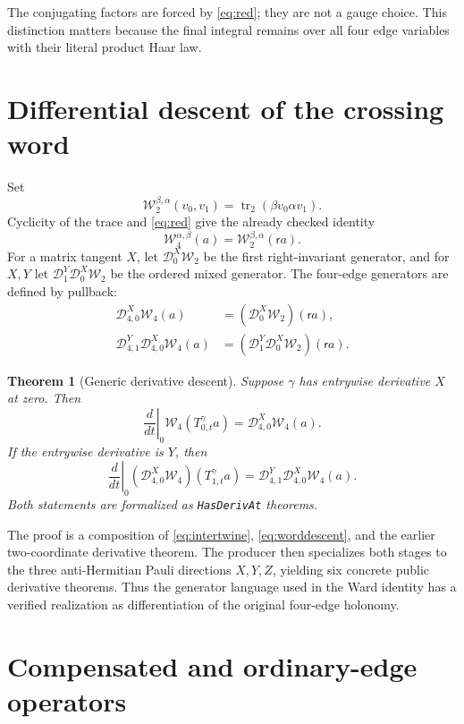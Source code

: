 \documentclass[11pt]{article}
\newtheorem{theorem}{Theorem}[section]
\theoremstyle{definition}
\newcommand{\trn}{\operatorname{tr}_2}
\newcommand{\red}{\mathsf r}
\newcommand{\W}{\mathcal W}
\newcommand{\D}{\mathcal D}
\begin{document}
The conjugating factors are forced by \eqref{eq:red}; they are not a gauge
choice.  This distinction matters because the final integral remains over
all four edge variables with their literal product Haar law.

\section{Differential descent of the crossing word}

Set
\[
 \W_2^{\beta,\alpha}(v_0,v_1)=\trn(\beta v_0\alpha v_1).
\]
Cyclicity of the trace and \eqref{eq:red} give the already checked identity
\begin{equation}\label{eq:worddescent}
 \W_4^{\alpha,\beta}(a)=\W_2^{\beta,\alpha}(\red a).
\end{equation}
For a matrix tangent $X$, let $\D_0^X\W_2$ be the first right-invariant
generator, and for $X,Y$ let $\D_1^Y\D_0^X\W_2$ be the ordered mixed
generator.  The four-edge generators are defined by pullback:
\begin{align}
 \D_{4,0}^{X}\W_4(a)&=(\D_0^X\W_2)(\red a),\label{eq:first}\\
 \D_{4,1}^{Y}\D_{4,0}^{X}\W_4(a)
   &=(\D_1^Y\D_0^X\W_2)(\red a).\label{eq:mixed}
\end{align}

\begin{theorem}[Generic derivative descent]\label{thm:derivative}
Suppose $\gamma$ has entrywise derivative $X$ at zero.  Then
\[
 \left.\frac d{dt}\right|_{0}\W_4(T_{0,t}^{\gamma}a)
 =\D_{4,0}^{X}\W_4(a).
\]
If the entrywise derivative is $Y$, then
\[
 \left.\frac d{dt}\right|_{0}
   (\D_{4,0}^{X}\W_4)(T_{1,t}^{\gamma}a)
 =\D_{4,1}^{Y}\D_{4,0}^{X}\W_4(a).
\]
Both statements are formalized as \texttt{HasDerivAt} theorems.
\end{theorem}

The proof is a composition of \eqref{eq:intertwine},
\eqref{eq:worddescent}, and the earlier two-coordinate derivative theorem.
The producer then specializes both stages to the three anti-Hermitian Pauli
directions $X,Y,Z$, yielding six concrete public derivative theorems.  Thus
the generator language used in the Ward identity has a verified realization
as differentiation of the original four-edge holonomy.

\section{Compensated and ordinary-edge operators}
\end{document}
